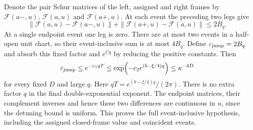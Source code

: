 Denote the pair Schur matrices of the left, assigned and right frames by $\mathcal F(a-,u)$, $\mathcal F(a,u)$ and $\mathcal F(a+,u)$. At each event the preceding two legs give
\[
 \|\mathcal F(a,u)-\mathcal F(a-,u)\|
 +\|\mathcal F(a+,u)-\mathcal F(a,u)\|\le2B_q.
\]
At a single endpoint event one leg is zero. There are at most two events in a half-open unit chart, so their event-inclusive sum is at most $4B_q$. Define $\varepsilon_{\rm jump}=2B_q$ and absorb this fixed factor and $e^{Cq}$ by reducing the positive constants. Then
\begin{equation}\label{eq:belowJ}
 \varepsilon_{\rm jump}\le e^{-c_1qT}
 \le\exp\!\left(-c_2e^{(b-\xi/4)q}\right)
 \le\kappa^{-4D}
\end{equation}
for every fixed $D$ and large $q$. Here $qT=e^{(b-\xi/4)q}/(2\pi)$.
There is no extra factor $q$ in the final double-exponential exponent. The endpoint matrices, their complement inverses and hence these two differences are continuous in $u$, since the detuning bound is uniform. This proves the full event-inclusive hypothesis, including the assigned closed-frame value and coincident events.
\label{end:below-family}
